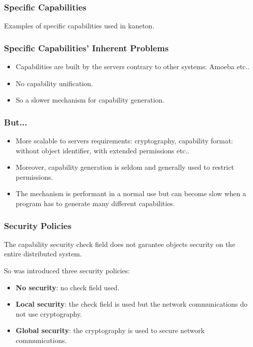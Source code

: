 
\begin{frame}
  \frametitle{Specific Capabilities}

  Examples of specific capabilities used in kaneton.

  \begin{center}
  \end{center}
\end{frame}


\begin{frame}
  \frametitle{Specific Capabilities' Inherent Problems}

  \begin{itemize}[<+->]
    \item
      Capabilities are built by the servers contrary to other systems:
      Amoeba etc..
    \item
      No capability unification.
    \item
      So a slower mechanism for capability generation.
  \end{itemize}
\end{frame}


\begin{frame}
  \frametitle{But...}

  \begin{itemize}[<+->]
    \item
      More scalable to servers requirements: cryptography,
      capability format: without object identifier, with extended
      permissions etc..
    \item
      Moreover, capability generation is seldom and generally used
      to restrict permissions.
    \item
      The mechanism is performant in a normal use but can become
      slow when a program has to generate many different capabilities.
  \end{itemize}
\end{frame}


\begin{frame}
  \frametitle{Security Policies}

  The capability security check field does not garantee objects security on
  the entire distributed system.

  \nl

  So was introduced three security policies:

  \begin{itemize}[<+->]
    \item
      \textbf{No security}: no check field used.
    \item
      \textbf{Local security}: the check field is used but the
      network communications do not use cryptography.
    \item
      \textbf{Global security}: the cryptography is used to secure
      network communications.
  \end{itemize}
\end{frame}

